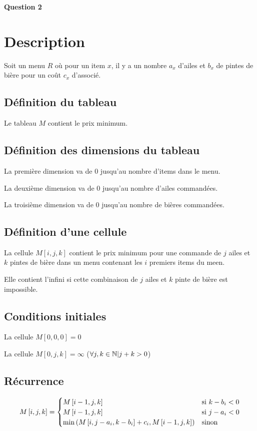 \documentclass[class=article]{standalone}
\begin{document}
\centerline{\Huge \bf Question 2}
\bigskip

\section*{Description}

Soit un menu $R$ où pour un item $x$, il y a un nombre $a_x$ d'ailes 
et $b_x$ de pintes de bière pour un coût $c_x$ d'associé.

\subsection*{Définition du tableau}

Le tableau $M$ contient le prix minimum.

\subsection*{Définition des dimensions du tableau}

La première dimension va de 0 jusqu'au nombre d'items dans le menu.

La deuxième dimension va de 0 jusqu'au nombre d'ailes commandées.

La troisième dimension va de 0 jusqu'au nombre de bières commandées.

\subsection*{Définition d'une cellule}

La cellule $M[i,j,k]$ contient le prix minimum pour une commande 
de $j$ ailes et $k$ pintes de bière dans un menu contenant les 
$i$ premiers items du meen.

Elle contient l'infini si cette combinaison de $j$ ailes et $k$ pinte de bière est impossible.


\subsection*{Conditions initiales}

La cellule $M[0, 0, 0] = 0$

La cellule $M[0, j, k] = \infty$ ($\forall j, k \in \mathbb{N} | j + k > 0$)

\subsection*{Récurrence}

\[
    M\left [ i, j, k \right ] =
    \begin{cases}
        M\left [ i-1, j, k \right ] & \text{si } k-b_i < 0 \\
        M\left [ i-1, j, k \right ] & \text{si } j-a_i < 0 \\
        \min\left ( M\left [ i, j-a_i, k-b_i \right ] + c_i, M\left [ i-1, j, k \right ] \right ) & \text{sinon }
    \end{cases}
\]
\end{document}
